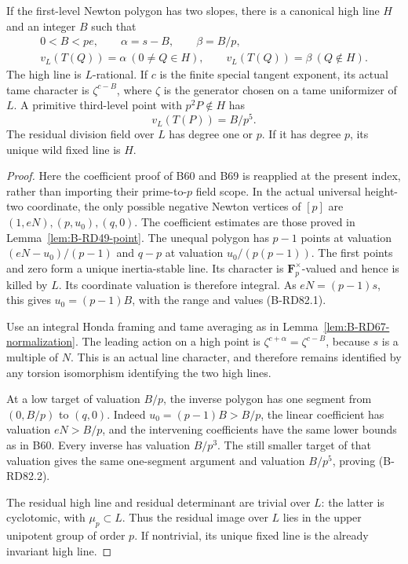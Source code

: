 \begin{lemma}
\label{lem:B-RD82-Newton}
If the first-level Newton polygon has two slopes, there is a
canonical high line \(H\) and an integer \(B\) such that
\[
 \begin{gathered}
 0<B<pe,\qquad \alpha=s-B,\qquad \beta=B/p,\\
 v_L(T(Q))=\alpha\ (0\ne Q\in H),\qquad
 v_L(T(Q))=\beta\ (Q\notin H).
 \end{gathered}                                      \tag{B-RD82.1}
\]
The high line is \(L\)-rational. If \(c\) is the finite
special tangent exponent, its actual tame character is
\(\zeta^{c-B}\), where \(\zeta\) is the generator chosen
on a tame uniformizer of \(L\). A primitive third-level
point with \(p^2P\notin H\) has
\[
                    v_L(T(P))=B/p^5.                 \tag{B-RD82.2}
\]
The residual division field over \(L\) has degree one or
\(p\). If it has degree \(p\), its unique wild fixed line
is \(H\).
\end{lemma}
\begin{proof}
Here the coefficient proof of B60 and B69 is reapplied at the
present index, rather than importing their prime-to-\(p\)
field scope. In the actual universal height-two coordinate,
the only possible negative Newton vertices of \([p]\) are
\((1,eN),(p,u_0),(q,0)\). The coefficient estimates are
those proved in Lemma~\ref{lem:B-RD49-point}. The unequal
polygon has \(p-1\) points at valuation
\((eN-u_0)/(p-1)\) and \(q-p\) at valuation
\(u_0/(p(p-1))\). The first points and zero form a
unique inertia-stable line. Its character is
\(\mathbf F_p^\times\)-valued and hence is killed by \(L\).
Its coordinate valuation is therefore integral. As
\(eN=(p-1)s\), this gives \(u_0=(p-1)B\), with the
range and values (B-RD82.1).

Use an integral Honda framing and tame averaging as in
Lemma~\ref{lem:B-RD67-normalization}. The leading action
on a high point is \(\zeta^{c+\alpha}=\zeta^{c-B}\),
because \(s\) is a multiple of \(N\). This is an actual
line character, and therefore remains identified by any
torsion isomorphism identifying the two high lines.

At a low target of valuation \(B/p\), the inverse polygon
has one segment from \((0,B/p)\) to \((q,0)\).
Indeed \(u_0=(p-1)B>B/p\), the linear coefficient has
valuation \(eN>B/p\), and the intervening coefficients
have the same lower bounds as in B60. Every inverse has
valuation \(B/p^3\). The still smaller target of that
valuation gives the same one-segment argument and
valuation \(B/p^5\), proving (B-RD82.2).

The residual high line and residual determinant are trivial
over \(L\): the latter is cyclotomic, with \(\mu_p\subset L\).
Thus the residual image over \(L\) lies in the upper
unipotent group of order \(p\). If nontrivial, its unique
fixed line is the already invariant high line.
\end{proof}

